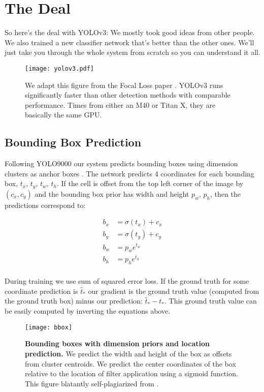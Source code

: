 \section{The Deal}

So here's the deal with YOLOv3: We mostly took good ideas from other people. We also trained a new classifier network that's better than the other ones. We'll just take you through the whole system from scratch so you can understand it all.

\begin{figure}[t]
\hspace{-6mm}
\texttt{[image: yolov3.pdf]}
\caption{We adapt this figure from the Focal Loss paper \cite{focal}. YOLOv3 runs significantly faster than other detection methods with comparable performance. Times from either an M40 or Titan X, they are basically the same GPU.}
\label{fig:teaser}
\vspace{-4mm}
\end{figure}

\subsection{Bounding Box Prediction}

Following YOLO9000 our system predicts bounding boxes using dimension clusters as anchor boxes \cite{redmon2017yolo9000}. The network predicts 4 coordinates for each bounding box, $t_x$, $t_y$, $t_w$, $t_h$. If the cell is offset from the top left corner of the image by $(c_x, c_y)$ and the bounding box prior has width and height $p_w$, $p_h$, then the predictions correspond to:

\begin{align*}
b_x &= \sigma(t_x) + c_x \\
b_y &= \sigma(t_y)  + c_y\\
b_w &= p_w e^{t_w}\\
b_h &= p_h e^{t_h}\\
\end{align*}

During training we use sum of squared error loss. If the ground truth for some coordinate prediction is $\hat{t}_{\mbox{*}}$ our gradient is the ground truth value (computed from the ground truth box) minus our prediction: $\hat{t}_{\mbox{*}} - t_{\mbox{*}}$. This ground truth value can be easily computed by inverting the equations above.


\begin{figure}[]
      \centering
        \texttt{[image: bbox]}
      \caption{\small \textbf{Bounding boxes with dimension priors and location prediction.} We predict the width and height of the box as offsets from cluster centroids. We predict the center coordinates of the box relative to the location of filter application using a sigmoid function. This figure blatantly self-plagiarized from \cite{redmon2017yolo9000}.}
      \label{box}
   \end{figure}


